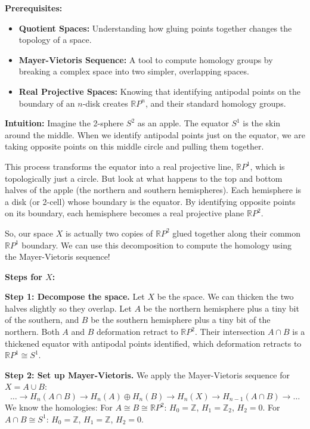 \begin{solution}
\textbf{Prerequisites:} 
\begin{itemize}
    \item \textbf{Quotient Spaces:} Understanding how gluing points together changes the topology of a space.
    \item \textbf{Mayer-Vietoris Sequence:} A tool to compute homology groups by breaking a complex space into two simpler, overlapping spaces.
    \item \textbf{Real Projective Spaces:} Knowing that identifying antipodal points on the boundary of an $n$-disk creates $\mathbb{R}P^n$, and their standard homology groups.
\end{itemize}

\textbf{Intuition:} 
Imagine the 2-sphere $S^2$ as an apple. The equator $S^1$ is the skin around the middle. When we identify antipodal points just on the equator, we are taking opposite points on this middle circle and pulling them together. 

This process transforms the equator into a real projective line, $\mathbb{R}P^1$, which is topologically just a circle. But look at what happens to the top and bottom halves of the apple (the northern and southern hemispheres). Each hemisphere is a disk (or 2-cell) whose boundary is the equator. By identifying opposite points on its boundary, each hemisphere becomes a real projective plane $\mathbb{R}P^2$. 

So, our space $X$ is actually two copies of $\mathbb{R}P^2$ glued together along their common $\mathbb{R}P^1$ boundary. We can use this decomposition to compute the homology using the Mayer-Vietoris sequence!

\textbf{Steps for $X$:}

\textbf{Step 1: Decompose the space.} 
Let $X$ be the space. We can thicken the two halves slightly so they overlap. Let $A$ be the northern hemisphere plus a tiny bit of the southern, and $B$ be the southern hemisphere plus a tiny bit of the northern. Both $A$ and $B$ deformation retract to $\mathbb{R}P^2$. Their intersection $A \cap B$ is a thickened equator with antipodal points identified, which deformation retracts to $\mathbb{R}P^1 \cong S^1$.

\textbf{Step 2: Set up Mayer-Vietoris.}
We apply the Mayer-Vietoris sequence for $X = A \cup B$:
\[ \dots \to H_n(A \cap B) \to H_n(A) \oplus H_n(B) \to H_n(X) \to H_{n-1}(A \cap B) \to \dots \]
We know the homologies:
For $A \cong B \cong \mathbb{R}P^2$: $H_0 = \mathbb{Z}$, $H_1 = \mathbb{Z}_2$, $H_2 = 0$.
For $A \cap B \cong S^1$: $H_0 = \mathbb{Z}$, $H_1 = \mathbb{Z}$, $H_2 = 0$.


\end{solution}
